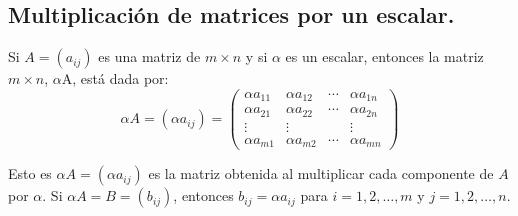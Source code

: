 \subsection{Multiplicación de matrices por un escalar.}
\begin{definition}
Si $A=(a_{ij})$ es una matriz de $m\times n$ y si $\alpha$ es un escalar, entonces la matriz $m\times n$, $\alpha$A, 
está dada por:\\
$$
\alpha A=\left(\alpha a_{i j}\right)=\left(\begin{array}{cccc}
\alpha a_{11} & \alpha a_{12} & \cdots & \alpha a_{1 n} \\
\alpha a_{21} & \alpha a_{22} & \cdots & \alpha a_{2 n} \\
\vdots & \vdots & & \vdots \\
\alpha a_{m 1} & \alpha a_{m 2} & \cdots & \alpha a_{m n}
\end{array}\right)
$$

Esto es $\alpha A=\left(\alpha a_{i j}\right)$ es la matriz obtenida al multiplicar cada componente de $A$ por $\alpha$. Si $\alpha A=B=\left(b_{i j}\right)$, entonces $b_{i j}=\alpha a_{i j}$ para $i=1,2, \ldots, m$ y $j=1,2, \ldots, n$.
\end{definition}

